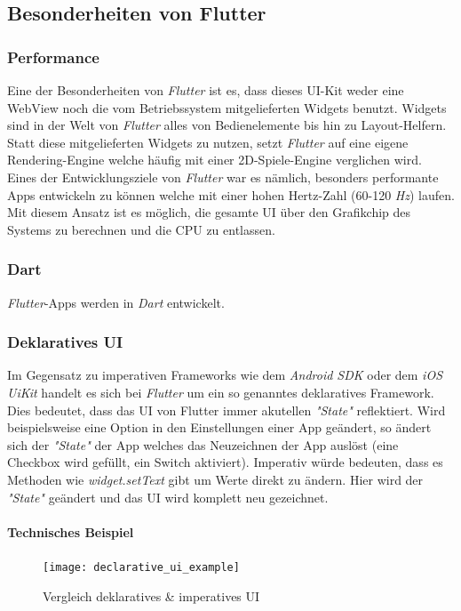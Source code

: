 \subsection{Besonderheiten von Flutter}
\subsubsection{Performance}
Eine der Besonderheiten von \textit{Flutter} ist es, dass dieses UI-Kit weder eine WebView
noch die vom Betriebssystem mitgelieferten Widgets benutzt. Widgets sind in der
Welt von \textit{Flutter} alles von Bedienelemente bis hin zu Layout-Helfern.
Statt diese mitgelieferten Widgets zu nutzen, setzt \textit{Flutter} auf eine
eigene Rendering-Engine welche häufig mit einer 2D-Spiele-Engine verglichen wird.
Eines der Entwicklungsziele von \textit{Flutter} war es nämlich,
besonders performante Apps entwickeln zu können welche mit einer hohen
Hertz-Zahl (60-120 \textit{Hz}) laufen. Mit diesem Ansatz ist es möglich,
die gesamte UI über den Grafikchip des Systems zu berechnen und die CPU zu entlassen.

\subsubsection{Dart}
\textit{Flutter}-Apps werden in \textit{Dart} entwickelt.

\subsubsection{Deklaratives UI}
Im Gegensatz zu imperativen Frameworks wie dem \textit{Android SDK}
oder dem \textit{iOS UiKit} handelt es sich bei \textit{Flutter} um
ein so genanntes deklaratives Framework. Dies bedeutet,
dass das UI von Flutter immer akutellen \textit{"State"} reflektiert.
Wird beispielsweise eine Option in den Einstellungen einer App geändert,
so ändert sich der \textit{"State"} der App welches das Neuzeichnen
der App auslöst (eine Checkbox wird gefüllt, ein Switch aktiviert).
Imperativ würde bedeuten, dass es Methoden wie \textit{widget.setText}
gibt um Werte direkt zu ändern. Hier wird der \textit{"State"} geändert
und das UI wird komplett neu gezeichnet.

\paragraph{Technisches Beispiel}\mbox{}
\hfill
\break

\begin{figure}[H]
    \centering
    \texttt{[image: declarative\_ui\_example]}
    \caption{Vergleich deklaratives \& imperatives UI}
\end{figure}


